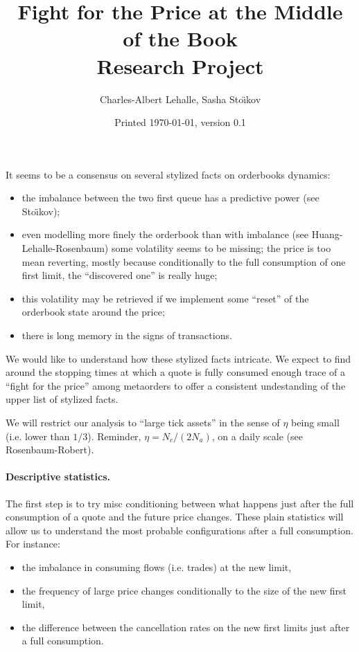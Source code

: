 \documentclass[a4paper,leqno]{article}
\title{Fight for the Price at the Middle of the Book\\Research Project}
\author{Charles-Albert Lehalle, Sasha Sto\"\i{}kov}
\date{Printed \today, version 0.1}
\begin{document}
\maketitle

It seems to be a consensus on several stylized facts on orderbooks dynamics:
\begin{itemize}
\item the imbalance between the two first queue has a predictive power (see Sto\"\i{}kov);
\item even modelling more finely the orderbook than with imbalance (see Huang-Lehalle-Rosenbaum) some volatility seems to be missing;
  the price is too mean reverting, mostly because conditionally to the full consumption of one first limit, the ``discovered one'' is really huge;
\item this volatility may be retrieved if we implement some ``reset'' of the orderbook state around the price;
\item there is long memory in the signs of transactions.
\end{itemize}
\medskip

We would like to understand how these stylized facts intricate.
We expect to find around the stopping times at which a quote is fully consumed enough trace of a ``fight for the price'' among metaorders to offer a consistent undestanding of the upper list of stylized facts.

We will restrict our analysis to ``large tick assets'' in the sense of $\eta$ being small  (i.e. lower than $1/3$).
Reminder, $\eta=N_c/(2N_a)$, on a daily scale (see Rosenbaum-Robert).

\paragraph{Descriptive statistics.}
The first step is to try misc conditioning between what happens just after the full consumption of a quote and the future price changes. These plain statistics will allow us to understand the most probable configurations after a full consumption. For instance:
\begin{itemize}
\item the imbalance in consuming flows (i.e. trades) at the new limit,
\item the frequency of large price changes conditionally to the size of the new first limit,
\item the difference between the cancellation rates on the new first limits just after a full consumption.
\end{itemize}
\end{document}
